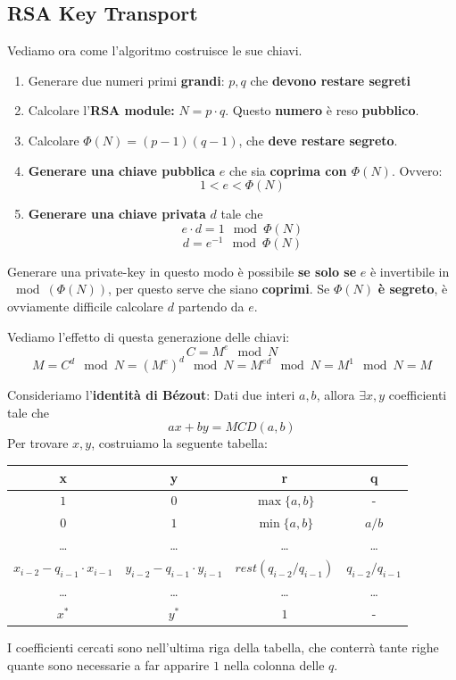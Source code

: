 \subsection{RSA Key Transport}
Vediamo ora come  l'algoritmo costruisce le sue chiavi.
\begin{definition}\label{def:rsakey}
\begin{enumerate}
    \item Generare due numeri primi \textbf{grandi}: $p,q$ che \textbf{devono restare segreti}
    \item Calcolare l'\textbf{RSA module:} $N=p\cdot q$. Questo \textbf{numero} è reso \textbf{pubblico}.
    \item Calcolare $\Phi(N)=(p-1)(q-1)$, che \textbf{deve restare segreto}.
    \item \textbf{Generare una chiave pubblica} $e$ che sia \textbf{coprima con $\Phi(N)$}. Ovvero: 
    \[1<e<\Phi(N)\]
    \item \textbf{Generare una chiave privata} $d$ tale che
    \[e\cdot d=1\mod\Phi(N)\]
    \[d=e^{-1}\mod\Phi(N)\]
\end{enumerate}
\begin{remark}
Generare una private-key in questo modo è possibile \textbf{se solo se} $e$ è invertibile in $\mod(\Phi(N))$, per questo serve che siano \textbf{coprimi}. Se $\Phi(N)$ \textbf{è segreto}, è ovviamente difficile calcolare $d$ partendo da $e$.
\end{remark}
\end{definition}
Vediamo l'effetto di questa generazione delle chiavi:
\[C=M^e\mod N\]
\[M=C^d\mod N=(M^e)^d\mod N=M^{ed}\mod N=M^1\mod N = M\]
\begin{definition}\label{def:exteuclid}
Consideriamo l'\textbf{identità di Bézout}: Dati due interi $a,b$, allora $\exists x,y$ coefficienti tale che
\[ax+by=MCD(a,b)\]
Per trovare $x,y$, costruiamo la seguente tabella:
\begin{center}
\begin{tabular}{|c|c|c|c|}
\hline
    x & y & r & q \\
\hline
    $1$ & $0$ & $\max\{a,b\}$& - \\ 
\hline
    $0$ & $1$ & $\min\{a,b\}$& $a/b$\\
 \hline
    \dots&\dots&\dots&\dots\\
\hline
    $x_{i-2}-q_{i-1}\cdot{x_{i-1}}$&$y_{i-2}-q_{i-1}\cdot{y_{i-1}}$&
    $rest(q_{i-2}/q_{i-1})$&$q_{i-2}/q_{i-1}$\\
\hline
    \dots&\dots&\dots&\dots\\
\hline
    $x^*$&$y^*$&$1$&-\\
\hline
\end{tabular}
\end{center}
I coefficienti cercati sono nell'ultima riga della tabella, che conterrà tante righe quante sono necessarie a far apparire $1$ nella colonna delle $q$. 
\end{definition}
